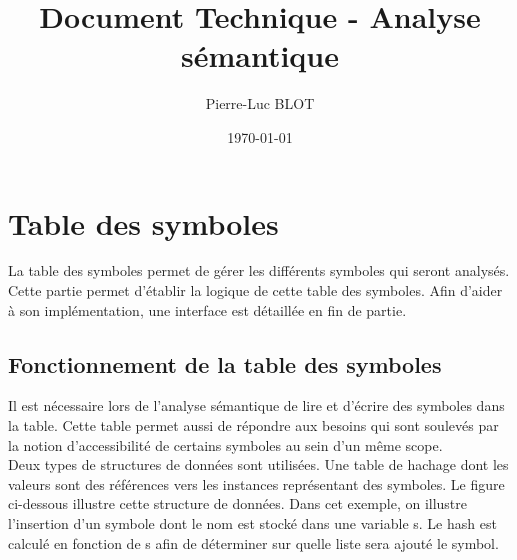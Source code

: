 \documentclass{../../res/univ-projet}
\title{Document Technique - Analyse sémantique}
\author{Pierre-Luc BLOT}
\date{\today}
\begin{document}
\maketitle
\newpage
\tableofcontents
\newpage

\section{Table des symboles}

La table des symboles permet de gérer les différents symboles qui seront analysés. Cette partie permet d'établir la logique de cette table des symboles. Afin d'aider à son implémentation, une interface est détaillée en fin de partie.

  \subsection{Fonctionnement de la table des symboles}
    Il est nécessaire lors de l'analyse sémantique de lire et d'écrire des symboles dans la table. Cette table permet aussi de répondre aux besoins qui sont soulevés par la notion d'accessibilité de certains symboles au sein d'un même scope.\\

    Deux types de structures de données sont utilisées. Une table de hachage dont les valeurs sont des références vers les instances représentant des symboles. Le figure ci-dessous illustre cette structure de données. Dans cet exemple, on illustre l'insertion d'un symbole dont le nom est stocké dans une variable s. Le hash est calculé en fonction de s afin de déterminer sur quelle liste sera ajouté le symbol.\\
\end{document}
